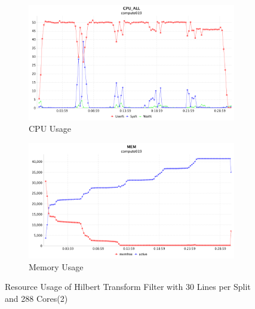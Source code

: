 \begin{figure}[!ht]
\centering
\begin{subfigure}{1\textwidth}
  \centering
  \includegraphics[width=1\linewidth]{figures/Htf30_288_CPU2.png}
  \caption{CPU Usage}
  \label{Htf30_288_CPU2}
\end{subfigure}
\begin{subfigure}{1\textwidth}
  \centering
  \includegraphics[width=1\linewidth]{figures/Htf30_288_MEM2.png}
  \caption{Memory Usage}
  \label{Htf30_288_MEM2}
\end{subfigure}
\caption{Resource Usage of Hilbert Transform Filter with 30 Lines per Split and 288 Cores(2)}
\label{Htf30_288_2}
\end{figure}


